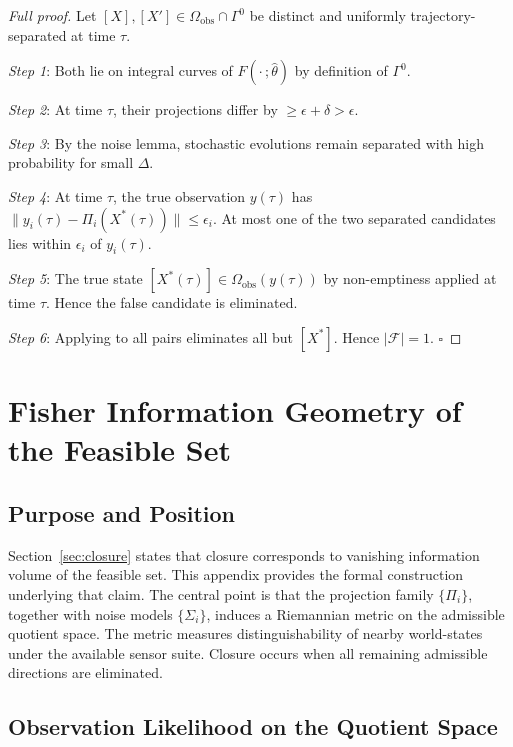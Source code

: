 \documentclass[11pt, oneside]{article}
\begin{document}
\begin{proof}[Full proof]
Let $[X],[X'] \in \Omega_{\mathrm{obs}} \cap \Gamma^0$ be distinct and uniformly
trajectory-separated at time $\tau$.

\textit{Step 1}: Both lie on integral curves of $F(\cdot\,;\hat{\theta})$ by definition of
$\Gamma^0$.

\textit{Step 2}: At time $\tau$, their projections differ by $\ge \epsilon + \delta > \epsilon$.

\textit{Step 3}: By the noise lemma, stochastic evolutions remain separated with high
probability for small $\Delta$.

\textit{Step 4}: At time $\tau$, the true observation $y(\tau)$ has
$\|y_i(\tau) - \Pi_i(X^*(\tau))\| \le \epsilon_i$. At most one of the two separated
candidates lies within $\epsilon_i$ of $y_i(\tau)$.

\textit{Step 5}: The true state $[X^*(\tau)] \in \Omega_{\mathrm{obs}}(y(\tau))$ by
non-emptiness applied at time $\tau$. Hence the false candidate is eliminated.

\textit{Step 6}: Applying to all pairs eliminates all but $[X^*]$. Hence
$|\mathcal{F}| = 1$. $\square$
\end{proof}

\section{Fisher Information Geometry of the Feasible Set}
\label{app:fisher}

\subsection{Purpose and Position}

Section~\ref{sec:closure} states that closure corresponds to vanishing information volume
of the feasible set. This appendix provides the formal construction underlying that claim.
The central point is that the projection family $\{\Pi_i\}$, together with noise models
$\{\Sigma_i\}$, induces a Riemannian metric on the admissible quotient space. The metric
measures distinguishability of nearby world-states under the available sensor suite.
Closure occurs when all remaining admissible directions are eliminated.

\subsection{Observation Likelihood on the Quotient Space}
\end{document}
